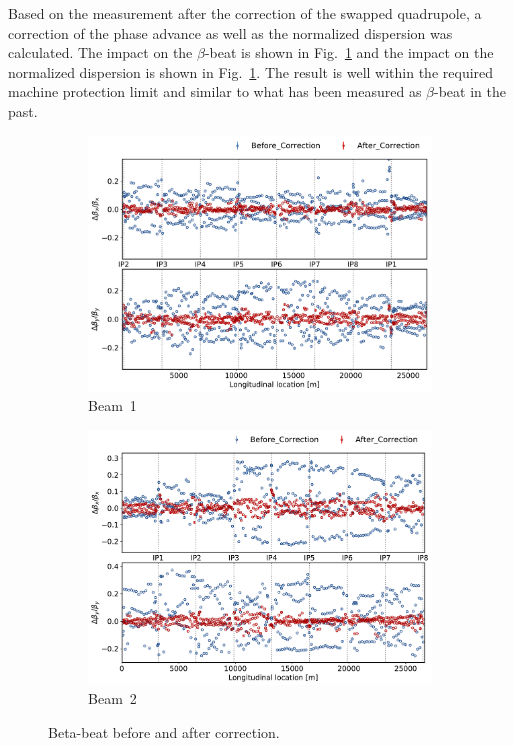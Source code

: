 \documentclass{cernatsnote}
\begin{document}
Based on the measurement after the correction of the swapped quadrupole, a correction of the phase advance as well as the normalized dispersion was calculated. The impact on the $\beta$-beat is shown in Fig.~\ref{fig:before_after_correction_beta_beat} and the impact on the normalized dispersion is shown in Fig.~\ref{fig:before_after_correction_beta_beat}. The result is well within the required machine protection limit and similar to what has been measured as $\beta$-beat in the past. 


\begin{figure}[ht]
\begin{subfigure}{.5\textwidth}
  \centering
  \includegraphics[width=.8\linewidth]{inj_linear/beamtest/beam1/beta_beat_before_and_after_corr.pdf}  
  \caption{Beam~1}
\end{subfigure}
\begin{subfigure}{.5\textwidth}
  \centering
  \includegraphics[width=.8\linewidth]{inj_linear/beamtest/beam2/beta_beat_before_after_correction.pdf}  
  \caption{Beam~2}
\end{subfigure}
\caption{Beta-beat before and after correction.}
\label{fig:before_after_correction_beta_beat}
\end{figure}
\end{document}
